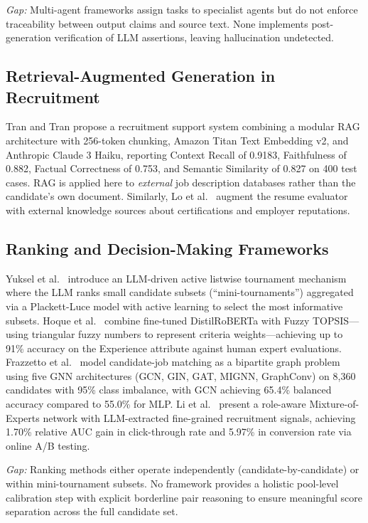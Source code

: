 \documentclass[journal]{IEEEtran}
\begin{document}
\textit{Gap:} Multi-agent frameworks assign tasks to specialist agents but do not
enforce traceability between output claims and source text. None implements
post-generation verification of LLM assertions, leaving hallucination undetected.

\subsection{Retrieval-Augmented Generation in Recruitment}

Tran and Tran \cite{tran2025} propose a recruitment support system combining a
modular RAG architecture with 256-token chunking, Amazon Titan Text Embedding v2,
and Anthropic Claude 3 Haiku, reporting Context Recall of 0.9183, Faithfulness
of 0.882, Factual Correctness of 0.753, and Semantic Similarity of 0.827 on 400
test cases. RAG is applied here to \emph{external} job description databases
rather than the candidate's own document. Similarly, Lo et al.\ \cite{lo2025}
augment the resume evaluator with external knowledge sources about certifications
and employer reputations.

\subsection{Ranking and Decision-Making Frameworks}

Yuksel et al.\ \cite{yuksel2026} introduce an LLM-driven active listwise
tournament mechanism where the LLM ranks small candidate subsets
(``mini-tournaments'') aggregated via a Plackett-Luce model with active learning
to select the most informative subsets. Hoque et al.\ \cite{hoque2026} combine
fine-tuned DistilRoBERTa with Fuzzy TOPSIS—using triangular fuzzy numbers to
represent criteria weights—achieving up to 91\% accuracy on the Experience
attribute against human expert evaluations. Frazzetto et al.\ \cite{frazzetto2026}
model candidate-job matching as a bipartite graph problem using five GNN
architectures (GCN, GIN, GAT, MIGNN, GraphConv) on 8,360 candidates with 95\%
class imbalance, with GCN achieving 65.4\% balanced accuracy compared to 55.0\%
for MLP. Li et al.\ \cite{li2026} present a role-aware Mixture-of-Experts network
with LLM-extracted fine-grained recruitment signals, achieving 1.70\% relative
AUC gain in click-through rate and 5.97\% in conversion rate via online A/B
testing.

\textit{Gap:} Ranking methods either operate independently (candidate-by-candidate)
or within mini-tournament subsets. No framework provides a holistic pool-level
calibration step with explicit borderline pair reasoning to ensure meaningful
score separation across the full candidate set.
\end{document}
